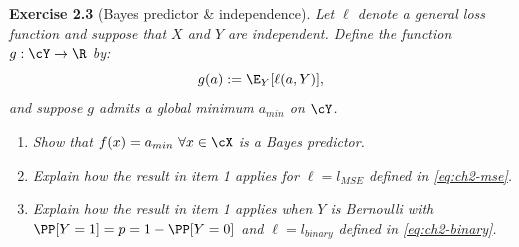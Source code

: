 \begin{tcolorbox}[remarkbox]
\textbf{Exercise 2.3} (Bayes predictor \& independence). \textit{Let $\ell$ denote a general
loss function and suppose that $X$ and $Y$ are independent. Define the
function $g : \cY \to \R$ by:}
\begin{equation}\label{eq:ch2-exindep}
g(a) := \E_Y[\ell(a, Y)],
\end{equation}
\textit{and suppose $g$ admits a global minimum $a_{min}$ on $\cY$.}
\begin{enumerate}
  \item \textit{Show that $f(x) = a_{min}\ \forall x \in \cX$ is a Bayes predictor.}
  \item \textit{Explain how the result in item 1 applies for $\ell = l_{MSE}$ defined in \eqref{eq:ch2-mse}.}
  \item \textit{Explain how the result in item 1 applies when $Y$ is Bernoulli with
  $\PP[Y = 1] = p = 1 - \PP[Y = 0]$ and $\ell = l_{binary}$ defined in \eqref{eq:ch2-binary}.}
\end{enumerate}
\end{tcolorbox}
